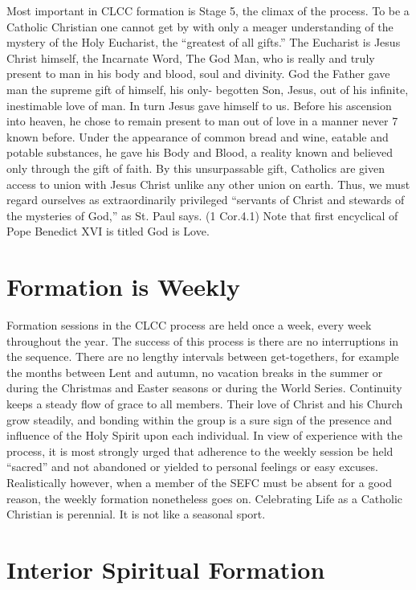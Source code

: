 \documentclass{article}        %
\begin{document}
Most important in CLCC formation is Stage 5, the climax of the process. To be a
Catholic Christian one cannot get by with only a meager understanding of the
mystery of the Holy Eucharist, the ``greatest of all gifts.'' The Eucharist is
Jesus Christ himself, the Incarnate Word, The God Man, who is really and truly
present to man in his body and blood, soul and divinity. God the Father gave man
the supreme gift of himself, his only- begotten Son, Jesus, out of his infinite,
inestimable love of man. In turn Jesus gave himself to us. Before his ascension
into heaven, he chose to remain present to man out of love in a manner never
7
known before. Under the appearance of common bread and wine, eatable and potable
substances, he gave his Body and Blood, a reality known and believed only
through the gift of faith. By this unsurpassable gift, Catholics are given
access to union with Jesus Christ unlike any other union on earth. Thus, we must
regard ourselves as extraordinarily privileged ``servants of Christ and stewards
of the mysteries of God,'' as St. Paul says. (1 Cor.4.1) Note that first
encyclical of Pope Benedict XVI is titled God is Love.

\section{Formation is Weekly}

Formation sessions in the CLCC process are held once a week, every week
throughout the year. The success of this process is there are no interruptions
in the sequence. There are no lengthy intervals between get-togethers, for
example the months between Lent and autumn, no vacation breaks in the summer or
during the Christmas and Easter seasons or during the World Series. Continuity
keeps a steady flow of grace to all members. Their love of Christ and his Church
grow steadily, and bonding within the group is a sure sign of the presence and
influence of the Holy Spirit upon each individual. In view of experience with
the process, it is most strongly urged that adherence to the weekly session be
held ``sacred'' and not abandoned or yielded to personal feelings or easy
excuses. Realistically however, when a member of the SEFC must be absent for a
good reason, the weekly formation nonetheless goes on. Celebrating Life as a
Catholic Christian is perennial. It is not like a seasonal sport.

\section{Interior Spiritual Formation}
\end{document}
